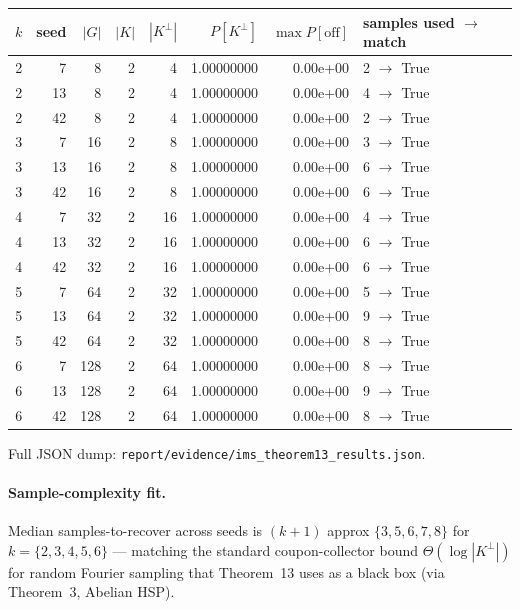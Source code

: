 \documentclass[11pt]{article}
\begin{document}
\begin{center}\footnotesize
\begin{tabular}{@{}rrrrrrrl@{}}
\toprule
$k$ & seed & $|G|$ & $|K|$ & $|K^\perp|$ & $P[K^\perp]$ &
   $\max\!P[\text{off}]$ & samples used $\to$ match \\
\midrule
2 &  7 &   8 & 2 &  4 & 1.00000000 & 0.00e+00 & 2 $\to$ True\\
2 & 13 &   8 & 2 &  4 & 1.00000000 & 0.00e+00 & 4 $\to$ True\\
2 & 42 &   8 & 2 &  4 & 1.00000000 & 0.00e+00 & 2 $\to$ True\\
3 &  7 &  16 & 2 &  8 & 1.00000000 & 0.00e+00 & 3 $\to$ True\\
3 & 13 &  16 & 2 &  8 & 1.00000000 & 0.00e+00 & 6 $\to$ True\\
3 & 42 &  16 & 2 &  8 & 1.00000000 & 0.00e+00 & 6 $\to$ True\\
4 &  7 &  32 & 2 & 16 & 1.00000000 & 0.00e+00 & 4 $\to$ True\\
4 & 13 &  32 & 2 & 16 & 1.00000000 & 0.00e+00 & 6 $\to$ True\\
4 & 42 &  32 & 2 & 16 & 1.00000000 & 0.00e+00 & 6 $\to$ True\\
5 &  7 &  64 & 2 & 32 & 1.00000000 & 0.00e+00 & 5 $\to$ True\\
5 & 13 &  64 & 2 & 32 & 1.00000000 & 0.00e+00 & 9 $\to$ True\\
5 & 42 &  64 & 2 & 32 & 1.00000000 & 0.00e+00 & 8 $\to$ True\\
6 &  7 & 128 & 2 & 64 & 1.00000000 & 0.00e+00 & 8 $\to$ True\\
6 & 13 & 128 & 2 & 64 & 1.00000000 & 0.00e+00 & 9 $\to$ True\\
6 & 42 & 128 & 2 & 64 & 1.00000000 & 0.00e+00 & 8 $\to$ True\\
\bottomrule
\end{tabular}
\end{center}
Full JSON dump: \verb|report/evidence/ims_theorem13_results.json|.

\paragraph{Sample-complexity fit.}
Median samples-to-recover across seeds is
$(k{+}1)$ approx $\{3,5,6,7,8\}$ for $k=\{2,3,4,5,6\}$ — matching the
standard coupon-collector bound $\Theta(\log|K^\perp|)$ for random Fourier
sampling that Theorem~13 uses as a black box (via Theorem~3, Abelian HSP).
\end{document}
